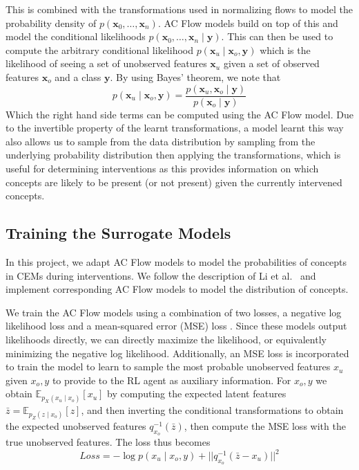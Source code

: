 \documentclass[../main.tex]{subfiles}
\begin{document}
This is combined with the transformations used in normalizing flows to 
model the probability density of $p(\mathbf{x}_0, \ldots, \mathbf{x}_n)$. 
AC Flow models
build on top of this and model the conditional likelihoods $p(\mathbf{x}_0, \ldots, \mathbf{x}_n \mid \mathbf{y})$.
This can then be used to compute the arbitrary conditional likelihood $p(\mathbf{x}_u \mid \mathbf{x}_o, \mathbf{y})$
which is the likelihood of
seeing a set of unobserved features $\mathbf{x}_u$
given a set of observed features $\mathbf{x}_o$ and a class $\mathbf{y}$. 
By using Bayes' theorem, we note that
\[p(\mathbf{x}_u \mid \mathbf{x}_o, \mathbf{y}) = \frac{p(\mathbf{x}_u, \mathbf{x}_o \mid \mathbf{y})}{p(\mathbf{x}_o \mid \mathbf{y})}\]
Which the right hand side terms can be computed using the AC Flow model.
Due to the invertible property of the learnt transformations,
a model learnt this way also allows us to sample from the data distribution
by sampling from the underlying probability distribution then applying the transformations, which is useful for
determining interventions as
this provides information on which concepts are likely to be present (or not present) given the currently intervened
concepts.

\subsection{Training the Surrogate Models}

In this project, we adapt AC Flow models to model the probabilities of concepts in CEMs during interventions.
We follow the description of Li et al.~\cite{afa} and implement corresponding AC Flow models to model
the distribution of concepts.

We train the AC Flow models using a combination of two losses, a negative
log likelihood loss and a mean-squared error (MSE) loss . 
Since these models output likelihoods directly,
we can directly maximize the likelihood, or equivalently minimizing the negative log likelihood.
Additionally, an MSE loss is incorporated to train the model to learn to sample the most probable unobserved features
$x_u$ given $x_o, y$ to provide
to the RL agent as auxiliary information. For $x_o, y$ we obtain $\mathbb{E}_{p_X(x_u \mid x_o)} [x_u]$ 
by computing the expected latent features $\bar{z} = \mathbb{E}_{p_Z(z \mid x_o)} [z]$, and then inverting 
the conditional transformations to obtain the expected unobserved features $q_{x_o}^{-1} (\bar{z})$, then compute the 
MSE loss with the true unobserved features. The loss thus becomes
\[Loss = - \log p(x_u \mid x_o, y) + ||q_{x_o}^{-1}(\bar{z} - x_u)||^2\]
\end{document}
